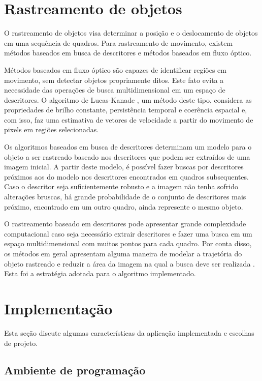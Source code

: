 \documentclass[a4paper]{coursepaper-br}
\begin{document}
\section{Rastreamento de objetos}
\label{sec:objtrack}

O rastreamento de objetos visa determinar a posição e o deslocamento
de objetos em uma sequência de quadros. Para rastreamento de
movimento, existem métodos baseados em busca de descritores e
métodos baseados em fluxo óptico.

Métodos baseados em fluxo óptico são capazes de identificar regiões em
movimento, sem detectar objetos propriamente ditos. Este fato evita a
necessidade das operações de busca multidimensional em um espaço de
descritores. O algoritmo de Lucas-Kanade \cite{Bradski2008}, um método
deste tipo, considera as propriedades de brilho constante,
persistência temporal e coerência espacial e, com isso, faz uma
estimativa de vetores de velocidade a partir do movimento de pixels em
regiões selecionadas.

Os algoritmos baseados em busca de descritores determinam um modelo
para o objeto a ser rastreado baseado nos descritores que podem ser
extraídos de uma imagem inicial. A partir deste modelo, é possível
fazer buscas por descritores próximos aos do modelo nos descritores
encontrados em quadros subsequentes. Caso o descritor seja
suficientemente robusto e a imagem não tenha sofrido alterações
bruscas, há grande probabilidade de o conjunto de descritores mais
próximo, encontrado em um outro quadro, ainda represente o mesmo
objeto.

O rastreamento baseado em descritores pode apresentar grande
complexidade computacional caso seja necessário extrair descritores e
fazer uma busca em um espaço multidimensional com muitos pontos para
cada quadro. Por conta disso, os métodos em geral apresentam alguma
maneira de modelar a trajetória do objeto rastreado e reduzir a área
da imagem na qual a busca deve ser realizada \cite{Zhou2009}. Esta
foi a estratégia adotada para o algoritmo implementado.

\section{Implementação}
\label{sec:impl}

Esta seção discute algumas características da aplicação implementada
e escolhas de projeto.

\subsection{Ambiente de programação}
\end{document}
